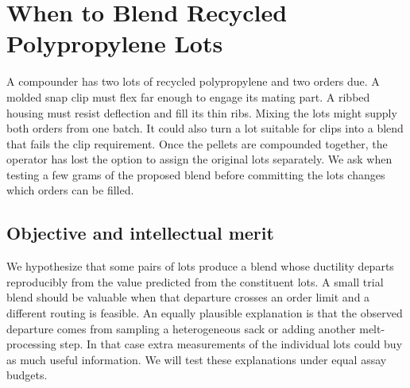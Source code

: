 \documentclass[11pt,letterpaper]{article}
\begin{document}
\section*{When to Blend Recycled Polypropylene Lots}

A compounder has two lots of recycled polypropylene and two orders due. A molded snap clip must flex far enough to engage its mating part. A ribbed housing must resist deflection and fill its thin ribs. Mixing the lots might supply both orders from one batch. It could also turn a lot suitable for clips into a blend that fails the clip requirement. Once the pellets are compounded together, the operator has lost the option to assign the original lots separately. We ask when testing a few grams of the proposed blend before committing the lots changes which orders can be filled.

\subsection*{Objective and intellectual merit}

We hypothesize that some pairs of lots produce a blend whose ductility departs reproducibly from the value predicted from the constituent lots. A small trial blend should be valuable when that departure crosses an order limit and a different routing is feasible. An equally plausible explanation is that the observed departure comes from sampling a heterogeneous sack or adding another melt-processing step. In that case extra measurements of the individual lots could buy as much useful information. We will test these explanations under equal assay budgets.

\begin{center}
\end{center}
\end{document}
